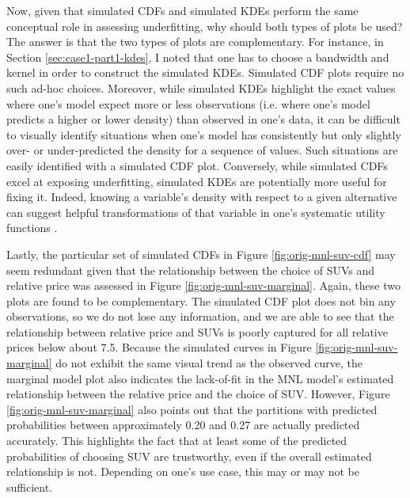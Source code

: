 \documentclass[preprint]{elsarticle}
\begin{document}
Now, given that simulated CDFs and simulated KDEs  perform the same conceptual role in assessing underfitting, why should both types of plots be used? The answer is that the two types of plots are complementary. For instance, in Section \ref{sec:case1-part1-kdes}, I noted that one has to choose a bandwidth and kernel in order to construct the simulated KDEs. Simulated CDF plots require no such ad-hoc choices. Moreover, while simulated KDEs highlight the exact values where one's model expect more or less observations (i.e. where one's model predicts a higher or lower density) than observed in one's data, it can be difficult to visually identify situations when one's model has consistently but only slightly over- or under-predicted the density for a sequence of values. Such situations are easily identified with a simulated CDF plot. Conversely, while simulated CDFs excel at exposing underfitting, simulated KDEs are potentially more useful for fixing it. Indeed, knowing a variable's density with respect to a given alternative can suggest helpful transformations of that variable in one's systematic utility functions \citep{kay_transformations_1987, bergtold_bernoulli_2009}.

Lastly, the particular set of simulated CDFs in Figure \ref{fig:orig-mnl-suv-cdf} may seem redundant given that the relationship between the choice of SUVs and relative price was assessed in Figure \ref{fig:orig-mnl-suv-marginal}. Again, these two plots are found to be complementary. The simulated CDF plot does not bin any observations, so we do not lose any information, and we are able to see that the relationship between relative price and SUVs is poorly captured for all relative prices below about 7.5. Because the simulated curves in Figure \ref{fig:orig-mnl-suv-marginal} do not exhibit the same visual trend as the observed curve, the marginal model plot also indicates the lack-of-fit in the MNL model's estimated relationship between the relative price and the choice of SUV. However, Figure \ref{fig:orig-mnl-suv-marginal} also points out that the partitions with predicted probabilities between approximately 0.20 and 0.27 are actually predicted accurately. This highlights the fact that at least some of the predicted probabilities of choosing SUV are trustworthy, even if the overall estimated relationship is not. Depending on one's use case, this may or may not be sufficient.
\end{document}

